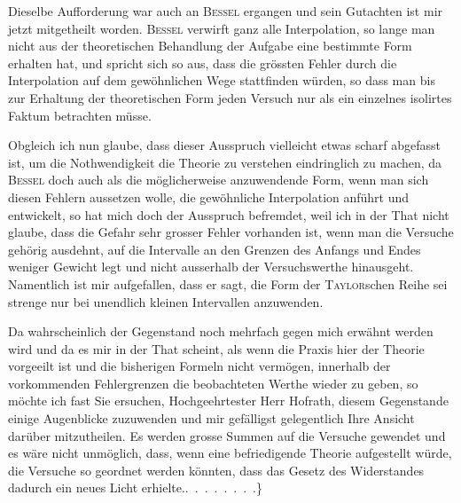 Dieselbe Aufforderung war auch an \textsc{Bessel} ergangen und sein Gutachten
ist mir jetzt mitgetheilt worden. \textsc{Bessel} verwirft ganz alle Interpolation, so
lange man nicht aus der theoretischen Behandlung der Aufgabe eine bestimmte
Form erhalten hat, und spricht sich so aus, dass die grössten Fehler durch
die Interpolation auf dem gewöhnlichen Wege stattfinden würden, so dass man
bis zur Erhaltung der theoretischen Form jeden Versuch nur als ein einzelnes
isolirtes Faktum betrachten müsse.

Obgleich ich nun glaube, dass dieser Ausspruch vielleicht etwas scharf
abgefasst ist, um die Nothwendigkeit die Theorie zu verstehen eindringlich
zu machen, da \textsc{Bessel} doch auch als die möglicherweise anzuwendende Form,
wenn man sich diesen Fehlern aussetzen wolle, die gewöhnliche Interpolation
anführt und entwickelt, so hat mich doch der Ausspruch befremdet, weil ich
in der That nicht glaube, dass die Gefahr sehr grosser Fehler vorhanden
ist, wenn man die Versuche gehörig ausdehnt, auf die Intervalle an den
Grenzen des Anfangs und Endes weniger Gewicht legt und nicht ausserhalb
der Versuchswerthe hinausgeht. Namentlich ist mir aufgefallen, dass er sagt,
die Form der \textsc{Taylor}schen Reihe sei strenge nur bei unendlich kleinen Intervallen
anzuwenden.

Da wahrscheinlich der Gegenstand noch mehrfach gegen mich erwähnt
werden wird und da es mir in der That scheint, als wenn die Praxis hier der
Theorie vorgeeilt ist und die bisherigen Formeln nicht vermögen, innerhalb
der vorkommenden Fehlergrenzen die beobachteten Werthe wieder zu geben,
so möchte ich fast Sie ersuchen, Hochgeehrtester Herr Hofrath, diesem Gegenstande
einige Augenblicke zuzuwenden und mir gefälligst gelegentlich Ihre
Ansicht darüber mitzutheilen. Es werden grosse Summen auf die Versuche
gewendet und es wäre nicht unmöglich, dass, wenn eine befriedigende Theorie
\HistoricalFoot{}{7\textsuperscript{*}}
\clearpage{}
\noindent aufgestellt würde, die Versuche so geordnet werden könnten, dass das Gesetz
des Widerstandes dadurch ein neues Licht erhielte.\quad .\ .\ .\ .\ .\ .\ .\ .\}
\clearpage\endgroup
